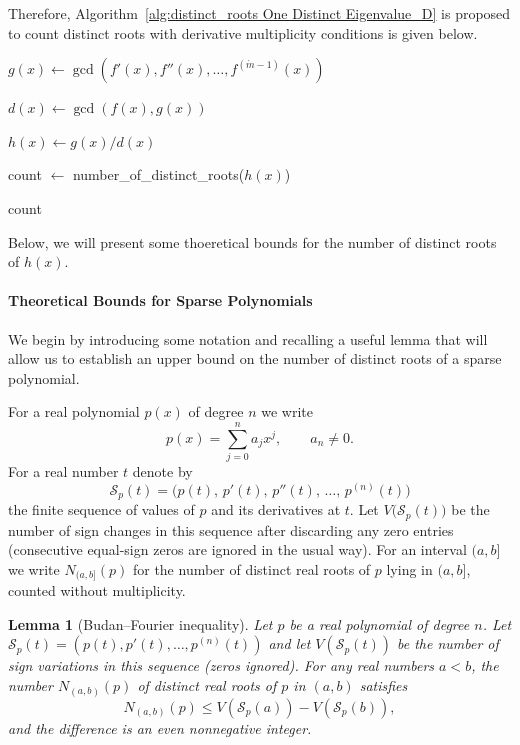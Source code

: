 \documentclass[11pt]{article}
\makeatletter
\newtheorem{lemma}{Lemma}
\newcommand{\removelatexerror}{\let\@latex@error\@gobble}
\makeatother
\begin{document}
Therefore, Algorithm~\ref{alg:distinct_roots One Distinct Eigenvalue_D} is proposed to count distinct roots with derivative multiplicity conditions is given below. 

\begin{algorithm}[htbp]
\removelatexerror
\caption{Algorithm for Counting Distinct Roots}\label{alg:distinct_roots One Distinct Eigenvalue_D}

$g(x) \leftarrow \gcd(f'(x), f''(x), \ldots, f^{(\acute{m}-1)}(x))$ \;

$d(x) \leftarrow \gcd(f(x), g(x))$ \;

$h(x) \leftarrow g(x) / d(x)$ \;

count $\leftarrow$ number\_of\_distinct\_roots($h(x)$) \;

\Return count \;
\end{algorithm}


Below, we will present some thoeretical bounds for the number of distinct roots of $h(x)$. 

\paragraph{Theoretical Bounds for Sparse Polynomials}

We begin by introducing some notation and recalling a useful lemma that will allow us to establish an upper bound on the number of distinct roots of a sparse polynomial.  

For a real polynomial \(p(x)\) of degree \(n\) we write
\[
p(x)=\sum_{j=0}^n a_j x^j,\qquad a_n\neq 0.
\]
For a real number \(t\) denote by
\[
\mathcal{S}_p(t)=\big(p(t),\, p'(t),\, p''(t),\,\dots,\, p^{(n)}(t)\big)
\]
the finite sequence of values of \(p\) and its derivatives at \(t\).  Let \(V\big(\mathcal{S}_p(t)\big)\) be the number of sign changes in this sequence after discarding any zero entries (consecutive equal-sign zeros are ignored in the usual way).  For an interval \((a,b]\) we write \(N_{(a,b]}(p)\) for the number of distinct real roots of \(p\) lying in \((a,b]\), counted without multiplicity.

\begin{lemma}[Budan–Fourier inequality]\label{lem:budan-fourier}
Let \(p\) be a real polynomial of degree \(n\).  
Let \(\mathcal{S}_p(t) = (p(t), p'(t), \dots, p^{(n)}(t))\) and let \(V(\mathcal{S}_p(t))\) be the number of sign variations in this sequence (zeros ignored).  
For any real numbers \(a < b\), the number \(N_{(a,b)}(p)\) of distinct real roots of \(p\) in \((a,b)\) satisfies
\[
N_{(a,b)}(p) \le V(\mathcal{S}_p(a)) - V(\mathcal{S}_p(b)),
\]
and the difference is an even nonnegative integer.
\end{lemma}
\end{document}
